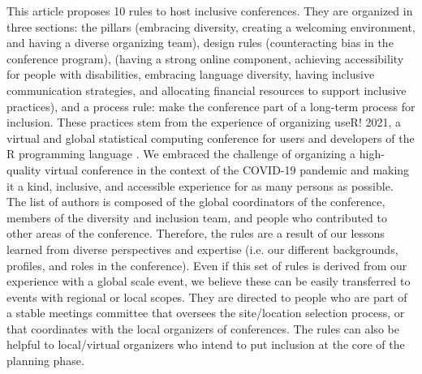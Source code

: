 \documentclass[10pt,letterpaper]{article}
\begin{document}
This article proposes 10 rules to host inclusive conferences.
They are organized in three sections: the pillars (embracing diversity, creating a welcoming environment, and having a diverse organizing team), design rules (counteracting bias in the conference program),  (having a strong online component, achieving accessibility for people with disabilities, embracing language diversity, having inclusive communication strategies, and allocating financial resources to support inclusive practices), and a process rule: make the conference part of a long-term process for inclusion. 
These practices stem from the experience of organizing useR! 2021, a virtual and global statistical computing conference for users and developers of the R programming language \cite{r_core_team_2021}. 
We embraced the challenge of organizing a high-quality virtual conference in the context of the COVID-19 pandemic and making it a kind, inclusive, and accessible experience for as many persons as possible. 
The list of authors is composed of the global coordinators of the conference, members of the diversity and inclusion team, and people who contributed to other areas of the conference. 
Therefore, the rules are a result of our lessons learned from diverse perspectives and expertise (i.e. our different backgrounds, profiles, and roles in the conference). 
Even if this set of rules is derived from our experience with a global scale event, we believe these can be easily transferred to events with regional or local scopes.
They are directed to people who are part of a stable meetings committee that oversees the site/location selection process, or that coordinates with the local organizers of conferences.
The rules can also be helpful to local/virtual organizers who intend to put inclusion at the core of the planning phase.

\end{document}
